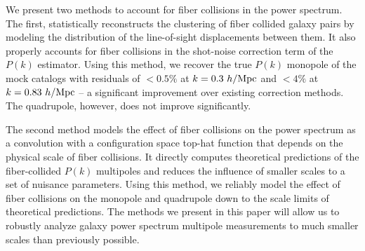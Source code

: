 \qquad We present two methods to account for fiber collisions in the power spectrum. The first, statistically reconstructs the clustering of fiber collided galaxy pairs by modeling the distribution of the line-of-sight displacements between them. It also properly accounts for fiber collisions in the shot-noise correction term of the $P(k)$ estimator. Using this method, we recover the true $P(k)$ monopole of the mock catalogs with residuals of $<0.5\%$ at $k=0.3~h/{\rm Mpc}$ and $<4\%$ at $k=0.83~h/{\rm Mpc}$ -- a significant improvement over existing correction methods. The quadrupole, however, does not improve significantly.

\qquad The second method models the effect of fiber collisions on the power spectrum as a convolution with a configuration space top-hat function that depends on the physical scale of fiber collisions. It directly computes theoretical predictions of the fiber-collided $P(k)$ multipoles and reduces the influence of smaller scales to a set of nuisance parameters. Using this method, we reliably model the effect of fiber collisions on the monopole and quadrupole down to the scale limits of theoretical predictions. The methods we present in this paper will allow us to robustly analyze galaxy power spectrum multipole measurements to much smaller scales than previously possible.

